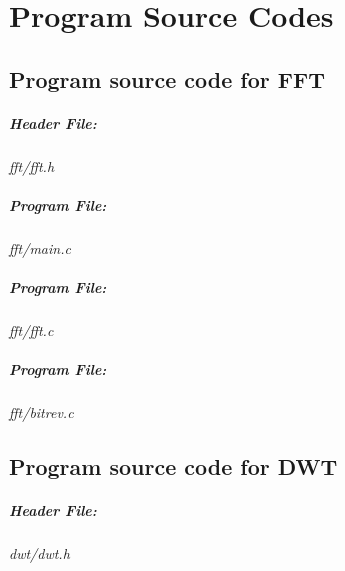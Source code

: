 \documentclass[a4paper,11pt]{report}
\begin{document}
\chapter{Program Source Codes}
\section{Program source code for FFT} \label{pscfft}
\paragraph{Header File:} \textit{fft/fft.h}
\vspace{5pt}
{\scriptsize
\begin{lgrind}

\end{lgrind}
}

\paragraph{Program File:} \textit{fft/main.c}
\vspace{5pt}
{\scriptsize
\begin{lgrind}

\end{lgrind}
}

\paragraph{Program File:} \textit{fft/fft.c}
\vspace{5pt}
{\scriptsize
\begin{lgrind}

\end{lgrind}
}

\paragraph{Program File:} \textit{fft/bitrev.c}
\vspace{5pt}
{\scriptsize
\begin{lgrind}

\end{lgrind}
}
\clearpage

\section{Program source code for DWT} \label{pscdwt}
\paragraph{Header File:} \textit{dwt/dwt.h}
\vspace{5pt}
{\scriptsize
\begin{lgrind}

\end{lgrind}
}
\end{document}
